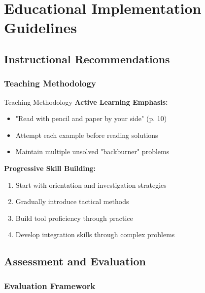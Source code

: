 \documentclass[12pt]{article}
\begin{document}
	\section{Educational Implementation Guidelines}
	
	\subsection{Instructional Recommendations}
	
	\subsubsection{Teaching Methodology}
	
	\begin{examplebox}{Teaching Methodology}
		\textbf{Active Learning Emphasis:}
		\begin{itemize}
			\item "Read with pencil and paper by your side" (p. 10)
			\item Attempt each example before reading solutions
			\item Maintain multiple unsolved "backburner" problems
		\end{itemize}
		
		\textbf{Progressive Skill Building:}
		\begin{enumerate}
			\item Start with orientation and investigation strategies
			\item Gradually introduce tactical methods
			\item Build tool proficiency through practice
			\item Develop integration skills through complex problems
		\end{enumerate}
	\end{examplebox}
	
	\subsection{Assessment and Evaluation}
	
	\subsubsection{Evaluation Framework}
	
\end{document}
